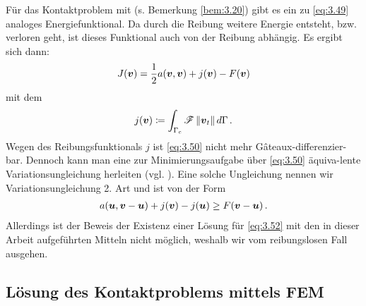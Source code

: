 \begin{bem}\label{bem:3.24}
Für das Kontaktproblem mit  (s. Bemerkung \ref{bem:3.20}) gibt es ein zu \eqref{eq:3.49} analoges Energiefunktional. Da durch die Reibung weitere Energie entsteht, bzw. verloren geht, ist dieses Funktional auch von der Reibung abhängig. Es ergibt sich dann:
\begin{align}\label{eq:3.50}
	J(\boldsymbol v) = \frac 12 a(\boldsymbol v,\boldsymbol v) + j(\boldsymbol v)-F(\boldsymbol v)
\end{align}
mit dem \textit{}
\begin{align}\label{eq:3.51}
	j(\boldsymbol v) \coloneqq \int_{\Gamma_c} \mathscr F\,  \lVert \boldsymbol v_t\rVert \, d\Gamma \, .
\end{align}
Wegen des Reibungsfunktionals $j$ ist \eqref{eq:3.50} nicht mehr Gâteaux-differenzier-bar. Dennoch kann man eine zur Minimierungsaufgabe über \eqref{eq:3.50} äquiva-lente Variationsungleichung herleiten (vgl. \cite{EPSContact}). Eine solche Ungleichung nennen wir Variationsungleichung 2. Art und ist von der Form
\begin{align}\label{eq:3.52}
	a(\boldsymbol u, \boldsymbol v-\boldsymbol u) + j(\boldsymbol v) -  j(\boldsymbol u) \ge F(\boldsymbol v-\boldsymbol u) \, .
\end{align}
Allerdings ist der Beweis der Existenz einer Lösung für \eqref{eq:3.52} mit den in dieser Arbeit aufgeführten Mitteln nicht möglich, weshalb wir vom reibungslosen Fall ausgehen.
\end{bem}






\subsection{Lösung des Kontaktproblems mittels FEM}
\label{kap:3.2.3}

